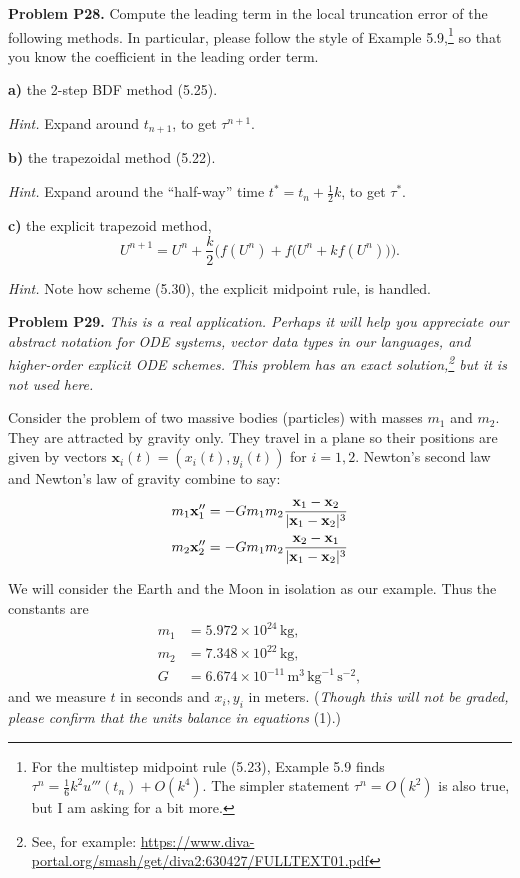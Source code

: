 \documentclass[12pt]{amsart}
\newcommand{\bx}{\mathbf{x}}
\newcommand{\prob}[1]{\bigskip\noindent\textbf{#1}\quad }
\newcommand{\epart}[1]{\medskip\noindent\textbf{#1)}\quad }
\begin{document}
\prob{Problem P28.}  Compute the leading term in the local truncation error of the following methods.  In particular, please follow the style of Example 5.9,\footnote{For the multistep midpoint rule (5.23), Example 5.9 finds $\tau^n = \frac{1}{6} k^2 u'''(t_n) + O(k^4)$.  The simpler statement $\tau^n=O(k^2)$ is also true, but I am asking for a bit more.} so that you know the coefficient in the leading order term.

\epart{a} the 2-step BDF method (5.25).

\medskip
\noindent \emph{Hint.}  Expand around $t_{n+1}$, to get $\tau^{n+1}$.

\epart{b} the trapezoidal method (5.22).

\medskip
\noindent \emph{Hint.}  Expand around the ``half-way'' time $t^* = t_n+\frac{1}{2}k$, to get $\tau^*$.

\epart{c} the explicit trapezoid method,
    $$U^{n+1} = U^n + \frac{k}{2} \Big(f(U^n) + f\big(U^n + k f(U^n)\big)\Big).$$

\medskip
\noindent \emph{Hint.}  Note how scheme (5.30), the explicit midpoint rule, is handled.


\prob{Problem P29.}  \emph{This is a real application.  Perhaps it will help you appreciate our abstract notation for ODE systems, vector data types in our languages, and higher-order explicit ODE schemes.  This problem has an exact solution,\footnote{See, for example: {\scriptsize\url{https://www.diva-portal.org/smash/get/diva2:630427/FULLTEXT01.pdf}}} but it is not used here.}

Consider the problem of two massive bodies (particles) with masses $m_1$ and $m_2$.  They are attracted by gravity only.  They travel in a plane so their positions are given by vectors $\bx_i(t) = (x_i(t),y_i(t))$ for $i=1,2$.  Newton's second law and Newton's law of gravity combine to say:
\begin{align}
m_1 \bx_1'' &= - G m_1 m_2 \frac{\bx_1 - \bx_2}{|\bx_1 - \bx_2|^3} \label{twobody} \\
m_2 \bx_2'' &= - G m_1 m_2 \frac{\bx_2 - \bx_1}{|\bx_1 - \bx_2|^3} \notag
\end{align}

We will consider the Earth and the Moon in isolation as our example.  Thus the constants are
\begin{align*}
m_1 &= 5.972 \times 10^{24} \,\text{kg}, \\
m_2 &= 7.348 \times 10^{22} \,\text{kg}, \\
G &= 6.674 \times 10^{-11}\,\text{m}^3\,\text{kg}^{-1}\,\text{s}^{-2},
\end{align*}
and we measure $t$ in seconds and $x_i,y_i$ in meters.  (\emph{Though this will not be graded, please confirm that the units balance in equations} (1).)
\end{document}
